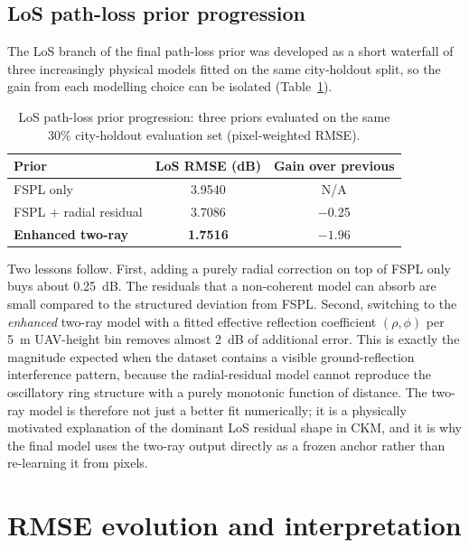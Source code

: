 \subsection{LoS path-loss prior progression}

The LoS branch of the final path-loss prior was developed as a short waterfall of three
increasingly physical models fitted on the same city-holdout split, so the gain
from each modelling choice can be isolated
(Table~\ref{tab:try78_los_waterfall}).

\begin{table}[H]
\centering
\caption[LoS path-loss prior progression.]%
{LoS path-loss prior progression: three priors evaluated on the same
30\% city-holdout evaluation set (pixel-weighted RMSE).}
\label{tab:try78_los_waterfall}
\begin{tabular}{lcc}
\toprule
Prior & LoS RMSE (dB) & Gain over previous \\
\midrule
FSPL only                       & 3.9540 & N/A \\
FSPL + radial residual          & 3.7086 & $-$0.25 \\
\textbf{Enhanced two-ray}       & \textbf{1.7516} & $\mathbf{-1.96}$ \\
\bottomrule
\end{tabular}
\end{table}

Two lessons follow. First, adding a purely radial correction on top of FSPL
only buys about \SI{0.25}{dB}. The residuals that a non-coherent model can
absorb are small compared to the structured deviation from FSPL. Second,
switching to the \emph{enhanced} two-ray model with a fitted effective reflection
coefficient $(\rho, \phi)$ per \SI{5}{m} UAV-height bin removes almost
\SI{2}{dB} of additional error. This is exactly the magnitude expected when the
dataset contains a visible ground-reflection interference pattern, because the
radial-residual model cannot reproduce the oscillatory ring structure with a
purely monotonic function of distance. The two-ray model is therefore not just
a better fit numerically; it is a physically motivated explanation of the
dominant LoS residual shape in CKM, and it is why the final model uses the two-ray
output directly as a frozen anchor rather than re-learning it from pixels.

\section{RMSE evolution and interpretation}

